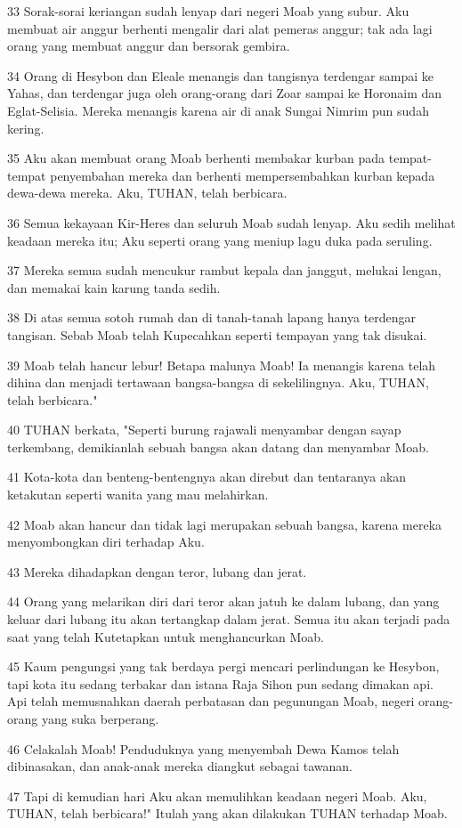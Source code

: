 \par 33 Sorak-sorai keriangan sudah lenyap dari negeri Moab yang subur. Aku membuat air anggur berhenti mengalir dari alat pemeras anggur; tak ada lagi orang yang membuat anggur dan bersorak gembira.
\par 34 Orang di Hesybon dan Eleale menangis dan tangisnya terdengar sampai ke Yahas, dan terdengar juga oleh orang-orang dari Zoar sampai ke Horonaim dan Eglat-Selisia. Mereka menangis karena air di anak Sungai Nimrim pun sudah kering.
\par 35 Aku akan membuat orang Moab berhenti membakar kurban pada tempat-tempat penyembahan mereka dan berhenti mempersembahkan kurban kepada dewa-dewa mereka. Aku, TUHAN, telah berbicara.
\par 36 Semua kekayaan Kir-Heres dan seluruh Moab sudah lenyap. Aku sedih melihat keadaan mereka itu; Aku seperti orang yang meniup lagu duka pada seruling.
\par 37 Mereka semua sudah mencukur rambut kepala dan janggut, melukai lengan, dan memakai kain karung tanda sedih.
\par 38 Di atas semua sotoh rumah dan di tanah-tanah lapang hanya terdengar tangisan. Sebab Moab telah Kupecahkan seperti tempayan yang tak disukai.
\par 39 Moab telah hancur lebur! Betapa malunya Moab! Ia menangis karena telah dihina dan menjadi tertawaan bangsa-bangsa di sekelilingnya. Aku, TUHAN, telah berbicara."
\par 40 TUHAN berkata, "Seperti burung rajawali menyambar dengan sayap terkembang, demikianlah sebuah bangsa akan datang dan menyambar Moab.
\par 41 Kota-kota dan benteng-bentengnya akan direbut dan tentaranya akan ketakutan seperti wanita yang mau melahirkan.
\par 42 Moab akan hancur dan tidak lagi merupakan sebuah bangsa, karena mereka menyombongkan diri terhadap Aku.
\par 43 Mereka dihadapkan dengan teror, lubang dan jerat.
\par 44 Orang yang melarikan diri dari teror akan jatuh ke dalam lubang, dan yang keluar dari lubang itu akan tertangkap dalam jerat. Semua itu akan terjadi pada saat yang telah Kutetapkan untuk menghancurkan Moab.
\par 45 Kaum pengungsi yang tak berdaya pergi mencari perlindungan ke Hesybon, tapi kota itu sedang terbakar dan istana Raja Sihon pun sedang dimakan api. Api telah memusnahkan daerah perbatasan dan pegunungan Moab, negeri orang-orang yang suka berperang.
\par 46 Celakalah Moab! Penduduknya yang menyembah Dewa Kamos telah dibinasakan, dan anak-anak mereka diangkut sebagai tawanan.
\par 47 Tapi di kemudian hari Aku akan memulihkan keadaan negeri Moab. Aku, TUHAN, telah berbicara!" Itulah yang akan dilakukan TUHAN terhadap Moab.


